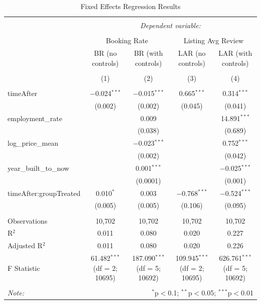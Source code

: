 \documentclass[
  12pt,
]{article}
\begin{document}
\begin{table}[!htbp] \centering 
  \caption{Fixed Effects Regression Results} 
  \label{} 
\tiny 
\begin{tabular}{@{\extracolsep{5pt}}lcccc} 
\\[-1.8ex]\hline 
\hline \\[-1.8ex] 
 & \multicolumn{4}{c}{\textit{Dependent variable:}} \\ 
\cline{2-5} 
\\[-1.8ex] & \multicolumn{2}{c}{Booking Rate} & \multicolumn{2}{c}{Listing Avg Review} \\ 
 & BR (no controls) & BR (with controls) & LAR (no controls) & LAR (with controls) \\ 
\\[-1.8ex] & (1) & (2) & (3) & (4)\\ 
\hline \\[-1.8ex] 
 timeAfter & $-$0.024$^{***}$ & $-$0.015$^{***}$ & 0.665$^{***}$ & 0.314$^{***}$ \\ 
  & (0.002) & (0.002) & (0.045) & (0.041) \\ 
  employment\_rate &  & 0.009 &  & 14.891$^{***}$ \\ 
  &  & (0.038) &  & (0.689) \\ 
  log\_price\_mean &  & $-$0.023$^{***}$ &  & 0.752$^{***}$ \\ 
  &  & (0.002) &  & (0.042) \\ 
  year\_built\_to\_now &  & 0.001$^{***}$ &  & $-$0.025$^{***}$ \\ 
  &  & (0.0001) &  & (0.001) \\ 
  timeAfter:groupTreated & 0.010$^{*}$ & 0.003 & $-$0.768$^{***}$ & $-$0.524$^{***}$ \\ 
  & (0.005) & (0.005) & (0.106) & (0.095) \\ 
 \hline \\[-1.8ex] 
Observations & 10,702 & 10,702 & 10,702 & 10,702 \\ 
R$^{2}$ & 0.011 & 0.080 & 0.020 & 0.227 \\ 
Adjusted R$^{2}$ & 0.011 & 0.080 & 0.020 & 0.226 \\ 
F Statistic & 61.482$^{***}$ (df = 2; 10695) & 187.090$^{***}$ (df = 5; 10692) & 109.945$^{***}$ (df = 2; 10695) & 626.761$^{***}$ (df = 5; 10692) \\ 
\hline 
\hline \\[-1.8ex] 
\textit{Note:}  & \multicolumn{4}{r}{$^{*}$p$<$0.1; $^{**}$p$<$0.05; $^{***}$p$<$0.01} \\ 
\end{tabular} 
\end{table}
\end{document}
